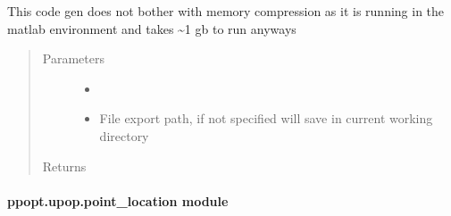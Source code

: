 \documentclass[letterpaper,10pt,english]{sphinxmanual}
\begin{document}
\begin{fulllineitems}
\label{\detokenize{ppopt.upop:ppopt.upop.linear_code_gen.generate_code_matlab}}
\sphinxAtStartPar
This code gen does not bother with memory compression as it is running in the matlab environment and takes \textasciitilde{}1 gb to run anyways
\begin{quote}\begin{description}
\item[{Parameters}] \leavevmode\begin{itemize}
\item {} 
\sphinxAtStartPar
{} \textendash{} 

\item {} 
\sphinxAtStartPar
{} \textendash{} File export path, if not specified will save in current working directory

\end{itemize}

\item[{Returns}] \leavevmode
\sphinxAtStartPar


\end{description}\end{quote}

\end{fulllineitems}



\paragraph{ppopt.upop.point\_location module}
\label{\detokenize{ppopt.upop:module-ppopt.upop.point_location}}\label{\detokenize{ppopt.upop:ppopt-upop-point-location-module}}
\end{document}
